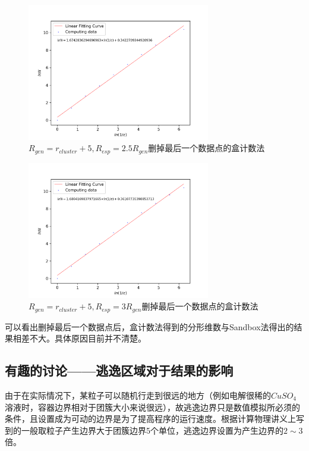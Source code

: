 \documentclass[a4paper,11pt]{article}
\begin{document}
\begin{figure}[!htbp]        
\centering
\includegraphics[bb= 0 0 460.8 345.6, width = 8cm]{分形维数/box-5-2.5*min-2.png}      
\caption{$R_{gen} = r_{cluster} + 5, R_{esp} = 2.5R_{gen}$删掉最后一个数据点的盒计数法}      
\end{figure}


\begin{figure}[!htbp]        
\centering
\includegraphics[bb= 0 0 460.8 345.6, width = 8cm]{分形维数/box-5-3*min-2.png}      
\caption{$R_{gen} = r_{cluster} + 5, R_{esp} = 3R_{gen}$删掉最后一个数据点的盒计数法}      
\end{figure}

\newpage
可以看出删掉最后一个数据点后，盒计数法得到的分形维数与Sandbox法得出的结果相差不大。具体原因目前并不清楚。



\subsection{有趣的讨论——逃逸区域对于结果的影响}

由于在实际情况下，某粒子可以随机行走到很远的地方（例如电解很稀的$CuSO_{4}$溶液时，容器边界相对于团簇大小来说很远），故逃逸边界只是数值模拟所必须的条件，且设置成为可动的边界是为了提高程序的运行速度。根据计算物理讲义上写到的一般取粒子产生边界大于团簇边界5个单位，逃逸边界设置为产生边界的$2\sim 3$倍。
\end{document}
